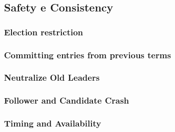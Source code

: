 \subsection{Safety e Consistency}
  \subsubsection{Election restriction}
  \subsubsection{Committing entries from previous terms}
  \subsubsection{Neutralize Old Leaders}
  \subsubsection{Follower and Candidate Crash}
  \subsubsection{Timing and Availability}